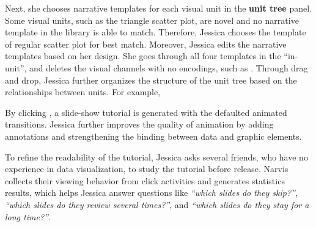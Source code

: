 Next, she chooses narrative templates for each visual unit in the \textbf{unit tree} panel. Some visual units, such as the triangle scatter plot, are novel and no narrative template in the library is able to match. Therefore, Jessica chooses the template of regular scatter plot for best match.
Moreover, Jessica edits the narrative templates based on her design. 
She goes through all four templates in the ``in-unit'', and deletes the visual channels with no encodings, such as . 
Through drag and drop, Jessica further organizes the structure of the unit tree based on the relationships between units. For example, 

By clicking , a slide-show tutorial is generated with the defaulted animated transitions. Jessica further improves the quality of animation by adding annotations and strengthening the binding between data and graphic elements. 


To refine the readability of the tutorial, Jessica asks several friends, who have no experience in data visualization, to study the tutorial before release. Narvis collects their viewing behavior from click activities and generates statistics results, which helps Jessica answer questions like \textit{``which slides do they skip?''}, \textit{``which slides do they review several times?''}, and \textit{``which slides do they stay for a long time?''}.




